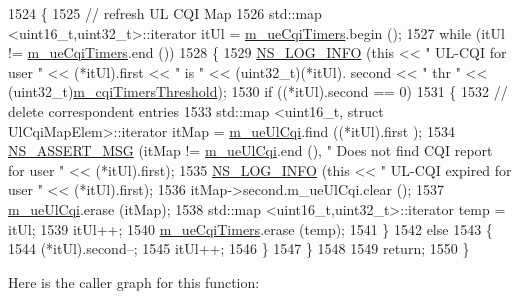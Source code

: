 \begin{DoxyCode}
1524 \{
1525   \textcolor{comment}{// refresh UL CQI  Map}
1526   std::map <uint16\_t,uint32\_t>::iterator itUl = \hyperlink{classns3_1_1MmWaveFlexTtiMaxWeightMacScheduler_a34da580592c7aae7c3b6e680728f0057}{m\_ueCqiTimers}.begin ();
1527   \textcolor{keywordflow}{while} (itUl != \hyperlink{classns3_1_1MmWaveFlexTtiMaxWeightMacScheduler_a34da580592c7aae7c3b6e680728f0057}{m\_ueCqiTimers}.end ())
1528     \{
1529       \hyperlink{group__logging_gafbd73ee2cf9f26b319f49086d8e860fb}{NS\_LOG\_INFO} (\textcolor{keyword}{this} << \textcolor{stringliteral}{" UL-CQI for user "} << (*itUl).first << \textcolor{stringliteral}{" is "} << (uint32\_t)(*itUl).
      second << \textcolor{stringliteral}{" thr "} << (uint32\_t)\hyperlink{classns3_1_1MmWaveFlexTtiMaxWeightMacScheduler_a12853e0079042ba54793594532d1ef15}{m\_cqiTimersThreshold});
1530       \textcolor{keywordflow}{if} ((*itUl).second == 0)
1531         \{
1532           \textcolor{comment}{// delete correspondent entries}
1533           std::map <uint16\_t, struct UlCqiMapElem>::iterator itMap = \hyperlink{classns3_1_1MmWaveFlexTtiMaxWeightMacScheduler_ab984a5ab7fb627aa66aac421719362c9}{m\_ueUlCqi}.find ((*itUl).first
      );
1534           \hyperlink{assert_8h_aff5ece9066c74e681e74999856f08539}{NS\_ASSERT\_MSG} (itMap != \hyperlink{classns3_1_1MmWaveFlexTtiMaxWeightMacScheduler_ab984a5ab7fb627aa66aac421719362c9}{m\_ueUlCqi}.end (), \textcolor{stringliteral}{" Does not find CQI report for
       user "} << (*itUl).first);
1535           \hyperlink{group__logging_gafbd73ee2cf9f26b319f49086d8e860fb}{NS\_LOG\_INFO} (\textcolor{keyword}{this} << \textcolor{stringliteral}{" UL-CQI expired for user "} << (*itUl).first);
1536           itMap->second.m\_ueUlCqi.clear ();
1537           \hyperlink{classns3_1_1MmWaveFlexTtiMaxWeightMacScheduler_ab984a5ab7fb627aa66aac421719362c9}{m\_ueUlCqi}.erase (itMap);
1538           std::map <uint16\_t,uint32\_t>::iterator temp = itUl;
1539           itUl++;
1540           \hyperlink{classns3_1_1MmWaveFlexTtiMaxWeightMacScheduler_a34da580592c7aae7c3b6e680728f0057}{m\_ueCqiTimers}.erase (temp);
1541         \}
1542       \textcolor{keywordflow}{else}
1543         \{
1544           (*itUl).second--;
1545           itUl++;
1546         \}
1547     \}
1548 
1549   \textcolor{keywordflow}{return};
1550 \}
\end{DoxyCode}


Here is the caller graph for this function\+:


